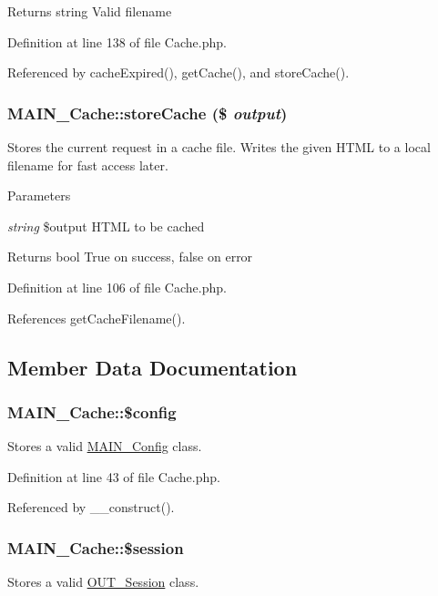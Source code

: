 \begin{DoxyReturn}{Returns}
string Valid filename 
\end{DoxyReturn}


Definition at line 138 of file Cache.php.

Referenced by cacheExpired(), getCache(), and storeCache().\hypertarget{classMAIN__Cache_a146320476b10d9bd545fb492ec929276}{
\subsubsection[{storeCache}]{\setlength{\rightskip}{0pt plus 5cm}MAIN\_\-Cache::storeCache (\$ {\em output})}}
\label{d2/d41/classMAIN__Cache_a146320476b10d9bd545fb492ec929276}
Stores the current request in a cache file. Writes the given HTML to a local filename for fast access later.


\begin{DoxyParams}{Parameters}
\item[{\em string}]\$output HTML to be cached\end{DoxyParams}
\begin{DoxyReturn}{Returns}
bool True on success, false on error 
\end{DoxyReturn}


Definition at line 106 of file Cache.php.

References getCacheFilename().

\subsection{Member Data Documentation}
\hypertarget{classMAIN__Cache_a9e10bcda14432aaed68c259151ec2070}{
\subsubsection[{\$config}]{\setlength{\rightskip}{0pt plus 5cm}MAIN\_\-Cache::\$config}}
\label{d2/d41/classMAIN__Cache_a9e10bcda14432aaed68c259151ec2070}
Stores a valid \hyperlink{classMAIN__Config}{MAIN\_\-Config} class. 

Definition at line 43 of file Cache.php.

Referenced by \_\-\_\-construct().\hypertarget{classMAIN__Cache_ad1ffa30f8ad4128b1a1fdaec2d60d7df}{
\subsubsection[{\$session}]{\setlength{\rightskip}{0pt plus 5cm}MAIN\_\-Cache::\$session}}
\label{d2/d41/classMAIN__Cache_ad1ffa30f8ad4128b1a1fdaec2d60d7df}
Stores a valid \hyperlink{classOUT__Session}{OUT\_\-Session} class. 

